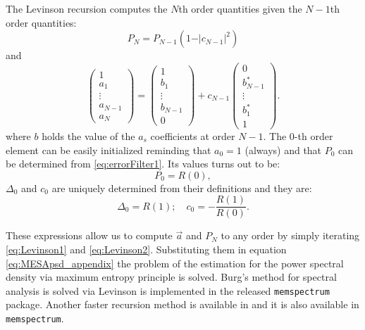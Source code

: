 \documentclass[twocolumn,showpacs,preprintnumbers,nofootinbib,prd,
superscriptaddress,10pt]{revtex4-1}
\begin{document}
The Levinson recursion computes the $N$th order quantities given the $N-1$th order quantities: 
\begin{equation} \label{eq:Levinson1}
P_N = P_{N -1}\left(1 - \vert c_{N - 1} \vert ^2\right)
\end{equation}
and 
\begin{equation} \label{eq:Levinson2}
\begin{pmatrix}
1 \\ a_1 \\ \vdots \\ a_{N - 1} \\ a_N
\end{pmatrix}
= 
\begin{pmatrix}
1 \\ b_1 \\ \vdots \\ b_{N -1} \\ 0
\end{pmatrix}
+ c_{N-1}
\begin{pmatrix}
0 \\ b_{N -1}^* \\ \vdots \\ b^*_1 \\ 1
\end{pmatrix}. 
\end{equation}
where $b$ holds the value of the $a_s$ coefficients at order $N-1$. 
The 0-th order element can be easily initialized reminding that $a_0 = 1$ (always) and that $P_0$ can be determined from \eqref{eq:errorFilter1}.
Its values turns out to be: 
\begin{equation}
P_0 = R(0),
\end{equation}
$\Delta_0$ and $c_0$ are uniquely determined from their definitions and they are:
\begin{equation}
\Delta_0 = R(1); \quad c_0 = -\frac{R(1)}{R(0)}. 
\end{equation}

These expressions allow us to compute $\vec a$ and $P_N$ to any order by simply iterating \eqref{eq:Levinson1} and \eqref{eq:Levinson2}. Substituting them in equation \eqref{eq:MESApsd_appendix} the problem of the estimation for the power spectral density via maximum entropy principle is solved.
Burg's method for spectral analysis is solved via Levinson is implemented in the released \texttt{memspectrum} package.
Another faster recursion method is available in \cite{Vos} and it is also available in \texttt{memspectrum}.

\newpage

	
	
\end{document}
